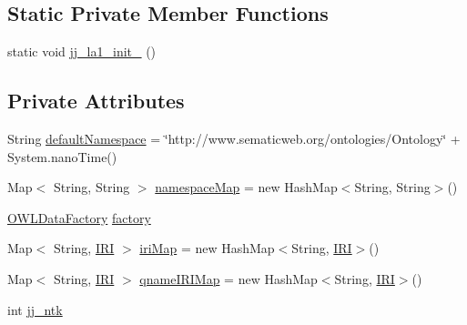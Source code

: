 \subsection*{Static Private Member Functions}
\begin{DoxyCompactItemize}
\item 
static void \hyperlink{classuk_1_1ac_1_1manchester_1_1cs_1_1owlapi_1_1dlsyntax_1_1parser_1_1_d_l_syntax_parser_ab5cdbbce5cdaec839d2cc833c7151e21}{jj\-\_\-la1\-\_\-init\-\_} ()
\end{DoxyCompactItemize}
\subsection*{Private Attributes}
\begin{DoxyCompactItemize}
\item 
String \hyperlink{classuk_1_1ac_1_1manchester_1_1cs_1_1owlapi_1_1dlsyntax_1_1parser_1_1_d_l_syntax_parser_a7dc9e98668883be06a18c2a89495ccae}{default\-Namespace} = \char`\"{}http\-://www.\-sematicweb.\-org/ontologies/Ontology\char`\"{} + System.\-nano\-Time()
\item 
Map$<$ String, String $>$ \hyperlink{classuk_1_1ac_1_1manchester_1_1cs_1_1owlapi_1_1dlsyntax_1_1parser_1_1_d_l_syntax_parser_a229ee241c964efe65e9daef6d66ad04b}{namespace\-Map} = new Hash\-Map$<$String, String$>$()
\item 
\hyperlink{interfaceorg_1_1semanticweb_1_1owlapi_1_1model_1_1_o_w_l_data_factory}{O\-W\-L\-Data\-Factory} \hyperlink{classuk_1_1ac_1_1manchester_1_1cs_1_1owlapi_1_1dlsyntax_1_1parser_1_1_d_l_syntax_parser_aa75acc1543de76f070892e9b73620936}{factory}
\item 
Map$<$ String, \hyperlink{classorg_1_1semanticweb_1_1owlapi_1_1model_1_1_i_r_i}{I\-R\-I} $>$ \hyperlink{classuk_1_1ac_1_1manchester_1_1cs_1_1owlapi_1_1dlsyntax_1_1parser_1_1_d_l_syntax_parser_ad90bb6981c406016978d37bad672b723}{iri\-Map} = new Hash\-Map$<$String, \hyperlink{classorg_1_1semanticweb_1_1owlapi_1_1model_1_1_i_r_i}{I\-R\-I}$>$()
\item 
Map$<$ String, \hyperlink{classorg_1_1semanticweb_1_1owlapi_1_1model_1_1_i_r_i}{I\-R\-I} $>$ \hyperlink{classuk_1_1ac_1_1manchester_1_1cs_1_1owlapi_1_1dlsyntax_1_1parser_1_1_d_l_syntax_parser_a597e1afb2e1a13f8c73de686d9f870d1}{qname\-I\-R\-I\-Map} = new Hash\-Map$<$String, \hyperlink{classorg_1_1semanticweb_1_1owlapi_1_1model_1_1_i_r_i}{I\-R\-I}$>$()
\item 
int \hyperlink{classuk_1_1ac_1_1manchester_1_1cs_1_1owlapi_1_1dlsyntax_1_1parser_1_1_d_l_syntax_parser_ae759ff45725ffe463419c8497bf42c42}{jj\-\_\-ntk}

\end{DoxyCompactItemize}
